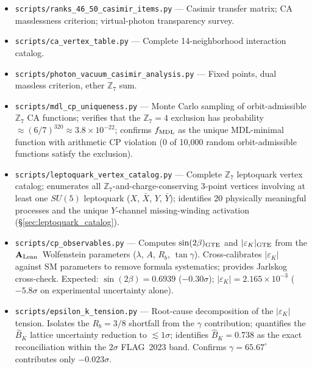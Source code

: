 \documentclass[11pt]{article}
\theoremstyle{remark}
\newcommand{\CatAL}{\ensuremath{\textbf{A}_{\rm Lean}}}
\begin{document}
\begin{appendices}
\begin{itemize}[nosep]
\item \texttt{scripts/ranks\_46\_50\_casimir\_items.py} --- Casimir transfer matrix;
  CA masslessness criterion; virtual-photon transparency survey.
\item \texttt{scripts/ca\_vertex\_table.py} --- Complete 14-neighborhood interaction catalog.
\item \texttt{scripts/photon\_vacuum\_casimir\_analysis.py} --- Fixed points, dual massless criterion,
  ether $\mathbb{Z}_7$ sum.
\item \texttt{scripts/mdl\_cp\_uniqueness.py} --- Monte Carlo sampling of orbit-admissible
  $\mathbb{Z}_7$ CA functions; verifies that the $\mathbb{Z}_7 = 4$ exclusion has
  probability $\approx (6/7)^{320} \approx 3.8 \times 10^{-22}$; confirms
  $f_{\rm MDL}$ as the unique MDL-minimal function with arithmetic CP violation
  (0 of 10{,}000 random orbit-admissible functions satisfy the exclusion).
\item \texttt{scripts/leptoquark\_vertex\_catalog.py} --- Complete $\mathbb{Z}_7$ leptoquark
  vertex catalog; enumerates all $\mathbb{Z}_7$-and-charge-conserving 3-point vertices
  involving at least one $SU(5)$ leptoquark ($X$, $\bar X$, $Y$, $\bar Y$);
  identifies 20 physically meaningful processes and the unique $Y$-channel missing-winding
  activation (\S\ref{sec:leptoquark_catalog}).
\item \texttt{scripts/cp\_observables.py} --- Computes $\sin(2\beta)_{\rm GTE}$
  and $|\varepsilon_K|_{\rm GTE}$ from the \CatAL\ Wolfenstein parameters ($\lambda$, $A$,
  $R_b$, $\tan\gamma$).  Cross-calibrates $|\varepsilon_K|$ against SM parameters to remove
  formula systematics; provides Jarlskog cross-check.
  Expected: $\sin(2\beta) = 0.6939$ ($-0.30\sigma$); $|\varepsilon_K| = 2.165\times10^{-3}$
  ($-5.8\sigma$ on experimental uncertainty alone).
\item \texttt{scripts/epsilon\_k\_tension.py} --- Root-cause decomposition of the
  $|\varepsilon_K|$ tension.  Isolates the $R_b = 3/8$ shortfall from the $\gamma$
  contribution; quantifies the $\hat{B}_K$ lattice uncertainty reduction to $\lesssim1\sigma$;
  identifies $\hat{B}_K = 0.738$ as the exact reconciliation within the $2\sigma$ FLAG~2023
  band.  Confirms $\gamma = 65.67^\circ$ contributes only $-0.023\sigma$.
\end{itemize}

\end{appendices}



\end{document}
